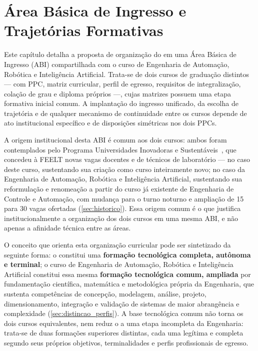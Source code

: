 \chapter{Área Básica de Ingresso e Trajetórias Formativas}
\label{chp:abi}

Este capítulo detalha a proposta de organização do \ppccurso em uma Área Básica de Ingresso (ABI) compartilhada com o curso de Engenharia de Automação, Robótica e Inteligência Artificial. Trata-se de dois cursos de graduação distintos — com PPC, matriz curricular, perfil de egresso, requisitos de integralização, colação de grau e diploma próprios —, cujas matrizes possuem uma etapa formativa inicial comum. A implantação do ingresso unificado, da escolha de trajetória e de qualquer mecanismo de continuidade entre os cursos depende de ato institucional específico e de disposições simétricas nos dois PPCs.

A origem institucional desta ABI é comum aos dois cursos: ambos foram contemplados pelo Programa Universidades Inovadoras e Sustentáveis~\cite{programa_universidades_inovadoras_sustentaveis}, que concedeu à FEELT novas vagas docentes e de técnicos de laboratório — no caso deste curso, sustentando sua criação como curso inteiramente novo; no caso da Engenharia de Automação, Robótica e Inteligência Artificial, sustentando sua reformulação e renomeação a partir do curso já existente de Engenharia de Controle e Automação, com mudança para o turno noturno e ampliação de 15 para 30 vagas ofertadas (\autoref{sec:historico}). Essa origem comum é o que justifica institucionalmente a organização dos dois cursos em uma mesma ABI, e não apenas a afinidade técnica entre as áreas.

O conceito que orienta esta organização curricular pode ser sintetizado da seguinte forma: o \ppccurso constitui uma \textbf{formação tecnológica completa, autônoma e terminal}; o curso de Engenharia de Automação, Robótica e Inteligência Artificial constitui essa mesma \textbf{formação tecnológica comum, ampliada} por fundamentação científica, matemática e metodológica própria da Engenharia, que sustenta competências de concepção, modelagem, análise, projeto, dimensionamento, integração e validação de sistemas de maior abrangência e complexidade (\autoref{sec:distincao_perfis}). A base tecnológica comum não torna os dois cursos equivalentes, nem reduz o \ppccurso a uma etapa incompleta da Engenharia: trata-se de duas formações superiores distintas, cada uma legítima e completa segundo seus próprios objetivos, terminalidades e perfis profissionais de egresso.

